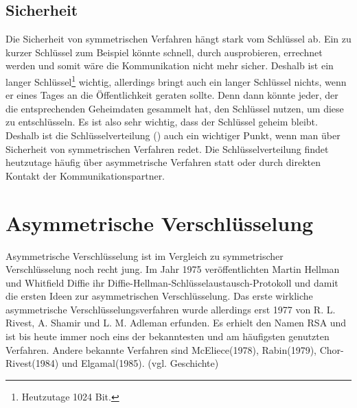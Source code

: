 \documentclass[a4paper,12pt,titlepage]{article}
\begin{document}
\subsection{Sicherheit}\label{symm:secu}
Die Sicherheit von symmetrischen Verfahren hängt stark vom Schlüssel ab. Ein zu kurzer Schlüssel zum Beispiel könnte schnell, durch ausprobieren, errechnet werden und somit wäre die Kommunikation nicht mehr sicher. Deshalb ist ein langer Schlüssel\footnote{Heutzutage 1024 Bit.} wichtig, allerdings bringt auch ein langer Schlüssel nichts, wenn er eines Tages an die Öffentlichkeit geraten sollte. Denn dann könnte jeder, der die entsprechenden Geheimdaten gesammelt hat, den Schlüssel nutzen, um diese zu entschlüsseln. Es ist also sehr wichtig, dass der Schlüssel geheim bleibt. Deshalb ist die Schlüsselverteilung (\cite{schlusselverteilung}) auch ein wichtiger Punkt, wenn man über Sicherheit von symmetrischen Verfahren redet. Die Schlüsselverteilung findet heutzutage häufig über asymmetrische Verfahren statt oder durch direkten Kontakt der Kommunikationspartner.

\newpage
\section{Asymmetrische Verschlüsselung}\label{asymm}
Asymmetrische Verschlüsselung ist im Vergleich zu symmetrischer Verschlüsselung noch recht jung. Im Jahr 1975 veröffentlichten Martin Hellman und Whitfield Diffie ihr Diffie-Hellman-Schlüsselaustausch-Protokoll und damit die ersten Ideen zur asymmetrischen Verschlüsselung. Das erste wirkliche asymmetrische Verschlüsselungsverfahren wurde allerdings erst 1977 von R. L. Rivest, A. Shamir und L. M. Adleman erfunden. Es erhielt den Namen RSA und ist bis heute immer noch eins der bekanntesten und am häufigsten genutzten Verfahren. Andere bekannte Verfahren sind McEliece(1978), Rabin(1979), Chor-Rivest(1984) und Elgamal(1985). (vgl. \cite{asymm_gesch} Geschichte)
\end{document}
